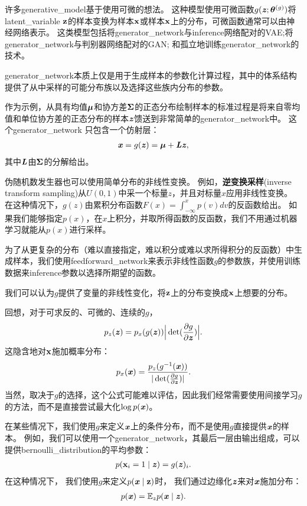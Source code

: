 许多\gls{generative_model}基于使用可微的想法。
这种模型使用可微函数$g(\boldsymbol{\mathit{z}};\boldsymbol{\theta}^{(g)})$将\gls{latent_variable} $\mathbf{z}$的样本变换为样本$\mathbf{x}$或样本$\mathbf{x}$上的分布，可微函数通常可以由神经网络表示。
这类模型包括将\gls{generator_network}与\gls{inference}网络配对的\gls{VAE};将\gls{generator_network}与判别器网络配对的\gls{GAN}; 和孤立地训练\gls{generator_network}的技术。


\gls{generator_network}本质上仅是用于生成样本的参数化计算过程，其中的体系结构提供了从中采样的可能分布族以及选择这些族内分布的参数。

作为示例，从具有均值$\boldsymbol{\mu}$和协方差$\boldsymbol{\Sigma}$的正态分布绘制样本的标准过程是将来自零均值和单位协方差的正态分布的样本$\boldsymbol{\mathit{z}}$馈送到非常简单的\gls{generator_network}中。 这个\gls{generator_network} 只包含一个仿射层：
\begin{align}
 \boldsymbol{\mathit{x}} = g(\boldsymbol{\mathit{z}}) = \boldsymbol{\mu} + \boldsymbol{\mathit{L}} \boldsymbol{\mathit{z}} ,
\end{align}
其中$\boldsymbol{\mathit{L}}$由$\boldsymbol{\Sigma}$的分解给出。


伪随机数发生器也可以使用简单分布的非线性变换。
例如，\textbf{逆变换采样}(inverse transform sampling)\citep{devroye2013non}从$U(0,1)$中采一个标量$z$，并且对标量$x$应用非线性变换。 %
在这种情况下，$g(z)$由累积分布函数$F(x) = \int_{-\infty}^{x} p(v) dv$的反函数给出。
如果我们能够指定$p(x)$，在$x$上积分，并取所得函数的反函数，我们不用通过机器学习就能从$p(x)$进行采样。

为了从更复杂的分布（难以直接指定，难以积分或难以求所得积分的反函数）中生成样本，我们使用\gls{feedforward_network}来表示非线性函数$g$的参数族，并使用训练数据来\gls{inference}参数以选择所期望的函数。

我们可以认为$g$提供了变量的非线性变化，将$\mathbf{z}$上的分布变换成$\mathbf{x}$上想要的分布。

回想，对于可求反的、可微的、连续的$g$，
\begin{align}
 p_z(\boldsymbol{\mathit{z}}) = p_x(g(\boldsymbol{\mathit{z}})) \Big | \det (\frac{\partial g}{\partial \boldsymbol{\mathit{z}}}) \Big |.
\end{align}
这隐含地对$\mathbf{x}$施加概率分布：
\begin{align}
 p_x(\boldsymbol{\mathit{x}}) = \frac{p_z(g^{-1}(\boldsymbol{\mathit{x}}))}{ | \det (\frac{\partial g}{\partial \boldsymbol{\mathit{z}}}) |}.
\end{align}
当然，取决于$g$的选择，这个公式可能难以评估，因此我们经常需要使用间接学习$g$的方法，而不是直接尝试最大化$\log p(\boldsymbol{\mathit{x}})$。

在某些情况下，我们使用$g$来定义$\boldsymbol{\mathit{x}}$上的条件分布，而不是使用$g$直接提供$\boldsymbol{\mathit{x}}$的样本。
例如，我们可以使用一个\gls{generator_network}，其最后一层由输出组成，可以提供\gls{bernoulli_distribution}的平均参数：
\begin{align}
 p(\mathbf{x}_i = 1  \mid  \boldsymbol{\mathit{z}}) = g(\boldsymbol{\mathit{z}})_i .
\end{align}
在这种情况下， 我们使用$g$来定义$p(\boldsymbol{\mathit{x}}  \mid  \mathbf{z})$时， 我们通过边缘化$\boldsymbol{\mathit{z}}$来对$\boldsymbol{\mathit{x}}$施加分布：
\begin{align}
 p(\boldsymbol{\mathit{x}}) = \mathbb{E}_z p(\boldsymbol{\mathit{x}}  \mid  \boldsymbol{\mathit{z}}).
\end{align}

